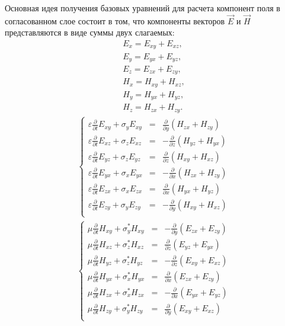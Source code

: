 Основная идея получения базовых уравнений для расчета компонент поля
в согласованном слое состоит в том, что компоненты векторов $\vec{E}$
и $\vec{H}$ представляются в виде суммы двух слагаемых:
\begin{align*}
    E_x = E_{xy}+E_{xz}, \\
    E_y = E_{yx}+E_{yz}, \\
    E_z = E_{zx}+E_{zy}, \\
    H_x = H_{xy}+H_{xz}, \\
    H_y = H_{yx}+H_{yz}, \\
    H_z = H_{zx}+H_{zy}.
\end{align*}
\begin{eqnarray}
\label{eq:pml13}
\left\{
\begin{array}{rcl}
  \varepsilon \frac{\partial}{\partial t}E_{xy} + \sigma_y E_{xy} & = & \frac{\partial}{\partial y}(H_{zx}+H_{zy}) \\
  \varepsilon \frac{\partial}{\partial t}E_{xz} + \sigma_z E_{xz} & = & - \frac{\partial}{\partial z}(H_{yz}+H_{yx}) \\
  \varepsilon \frac{\partial}{\partial t}E_{yz} + \sigma_z E_{yz} & = & \frac{\partial}{\partial z}(H_{xy}+H_{xz}) \\
  \varepsilon \frac{\partial}{\partial t}E_{yx} + \sigma_x E_{yx} & = & - \frac{\partial}{\partial x}(H_{zx}+H_{zy}) \\
  \varepsilon \frac{\partial}{\partial t}E_{zx} + \sigma_x E_{zx} & = & \frac{\partial}{\partial x}(H_{yx}+H_{yz}) \\
  \varepsilon \frac{\partial}{\partial t}E_{zy} + \sigma_y E_{zy} & = & - \frac{\partial}{\partial y}(H_{xy}+H_{xz}) \\
\end{array}
\right.
\end{eqnarray}
\begin{eqnarray}
\label{eq:pml14}
\left\{
\begin{array}{rcl}
  \mu \frac{\partial}{\partial t}H_{xy} + \sigma_y^* H_{xy} & = & - \frac{\partial}{\partial y}(E_{zx}+E_{zy}) \\
  \mu \frac{\partial}{\partial t}H_{xz} + \sigma_z^* H_{xz} & = & \frac{\partial}{\partial z}(E_{yz}+E_{yx}) \\
  \mu \frac{\partial}{\partial t}H_{yz} + \sigma_z^* H_{yz} & = & - \frac{\partial}{\partial z}(E_{xy}+E_{xz}) \\
  \mu \frac{\partial}{\partial t}H_{yx} + \sigma_x^* H_{yx} & = & \frac{\partial}{\partial x}(E_{zx}+E_{zy}) \\
  \mu \frac{\partial}{\partial t}H_{zx} + \sigma_x^* H_{zx} & = & - \frac{\partial}{\partial x}(E_{yx}+E_{yz}) \\
  \mu \frac{\partial}{\partial t}H_{zy} + \sigma_y^* H_{zy} & = & \frac{\partial}{\partial y}(E_{xy}+E_{xz}) \\
\end{array}
\right.
\end{eqnarray}

